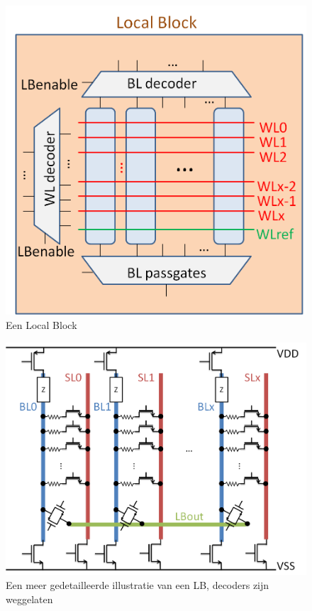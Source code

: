 \begin{figure}
  \centering
  \includegraphics[scale=0.3]{../fig/hfdstk-architecture-localblock.png}
  \caption[Een local block]{Een Local Block}
  \label{fig:LB}
\end{figure}

\begin{figure}
  \centering
  \includegraphics[scale=0.3]{../fig/hfdstk-architecture-LB-details.png}
  \caption[Een local block]{Een meer gedetailleerde illustratie van een LB, decoders zijn weggelaten}
  \label{fig:LB-details}
\end{figure}

